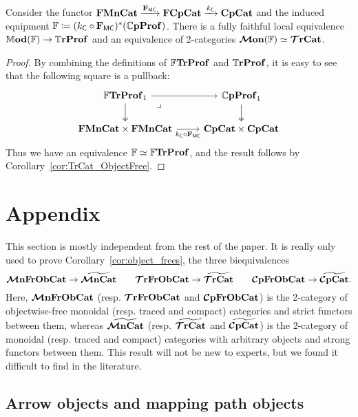 \documentclass[11pt,oneside,article]{memoir}
\begin{document}
\begin{proposition}
  Consider the functor $\mathbf{FMnCat}\xrightarrow{\mathbf{F}_{\mathsf{MC}}}\mathbf{FCpCat}\xrightarrow{k_{\mathsf{C}}}\mathbf{CpCat}$ and the induced
  equipment $\mathbb{F}\coloneqq(k_{\mathsf{C}}\circ\mathbf{F}_{\mathsf{MC}})^*(\mathbb{C}\mathbf{pProf})$. There is a fully faithful local equivalence $\mathbb{M}\mathbf{od}(\mathbb{F})\to\mathbb{T}\mathbf{rProf}$ and an equivalence of
  2-categories $\bm{\mathcal{M}}\mathbf{on}(\mathbb{F})\simeq\bm{\mathcal{T}}\mathbf{rCat}$.
\end{proposition}
\begin{proof}
  By combining the definitions of $\mathbb{F}\mathbf{TrProf}$ and $\mathbb{T}\mathbf{rProf}$, it is easy to see that the following
  square is a pullback:
  \begin{equation} \begin{tikzcd}
      \label{eqn:FTrProf_pullback}
    \dFrTrProf_1 \ar[r] \ar[d,two heads] \ar[dr,phantom,"\lrcorner" very near start]
      & \dCompProf_1 \ar[d,two heads] \\
    \FrMonCat\times\FrMonCat \ar[r,"k_{\MTCfont{C}}\circ\FMC"']
      & \CompCat\times\CompCat
  \end{tikzcd} \end{equation}
  Thus we have an equivalence $\mathbb{F}\simeq\mathbb{F}\mathbf{TrProf}$, and the result follows by
  Corollary~\ref{cor:TrCat_ObjectFree}.
\end{proof}

\appendix
\chapter{Appendix}
  \label{appendix}

This section is mostly independent from the rest of the paper. It is really only used to prove
Corollary~\ref{cor:object_frees}, the three biequivalences
\[
  \bm{\mathcal{M}}\mathbf{nFrObCat} \to \widetilde{\bm{\mathcal{M}}\mathbf{nCat}} \qquad
  \bm{\mathcal{T}}\mathbf{rFrObCat} \to \widetilde{\bm{\mathcal{T}}\mathbf{rCat}} \qquad
  \bm{\mathcal{C}}\mathbf{pFrObCat} \to \widetilde{\bm{\mathcal{C}}\mathbf{pCat}}.
\]
Here, $\bm{\mathcal{M}}\mathbf{nFrObCat}$ (resp. $\bm{\mathcal{T}}\mathbf{rFrObCat}$ and $\bm{\mathcal{C}}\mathbf{pFrObCat}$) is the 2-category of objectwise-free
monoidal (resp. traced and compact) categories and strict functors between them, whereas
$\widetilde{\bm{\mathcal{M}}\mathbf{nCat}}$ (resp. $\widetilde{\bm{\mathcal{T}}\mathbf{rCat}}$ and $\widetilde{\bm{\mathcal{C}}\mathbf{pCat}}$) is the 2-category of monoidal (resp.
traced and compact) categories with arbitrary objects and strong functors between them. This result
will not be new to experts, but we found it difficult to find in the literature.

\section{Arrow objects and mapping path objects}\label{sec:app_arrowObs}
\end{document}
